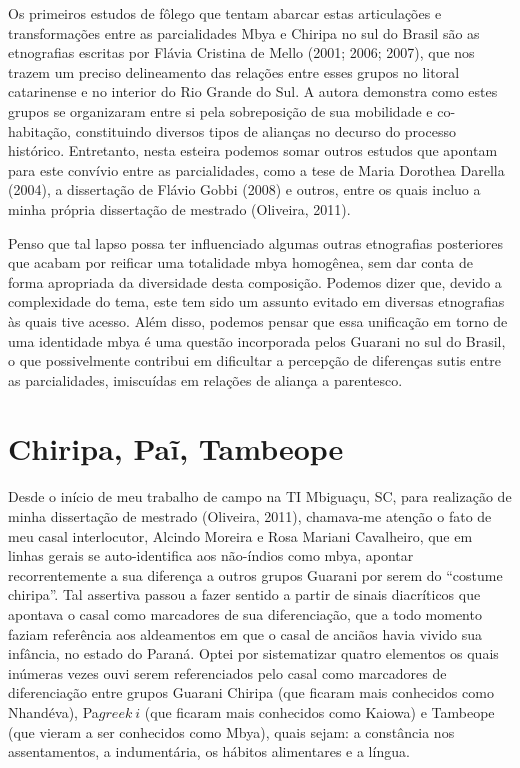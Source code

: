 Os primeiros estudos de fôlego que tentam abarcar estas articulações e
transformações entre as parcialidades Mbya e Chiripa no sul do Brasil
são as etnografias escritas por Flávia Cristina de Mello (2001; 2006;
2007), que nos trazem um preciso delineamento das relações entre esses
grupos no litoral catarinense e no interior do Rio Grande do Sul. A
autora demonstra como estes grupos se organizaram entre si pela
sobreposição de sua mobilidade e co-habitação, constituindo diversos
tipos de alianças no decurso do processo histórico. Entretanto, nesta
esteira podemos somar outros estudos que apontam para este convívio
entre as parcialidades, como a tese de Maria Dorothea Darella (2004), a
dissertação de Flávio Gobbi (2008) e outros, entre os quais incluo a
minha própria dissertação de mestrado (Oliveira, 2011). 

Penso que tal lapso possa ter influenciado algumas outras etnografias
posteriores que acabam por reificar uma totalidade mbya homogênea, sem
dar conta de forma apropriada da diversidade desta composição. Podemos
dizer que, devido a complexidade do tema, este tem sido um assunto
evitado em diversas etnografias às quais tive acesso. Além disso,
podemos pensar que essa unificação em torno de uma identidade mbya é
uma questão incorporada pelos Guarani no sul do Brasil, o que
possivelmente contribui em dificultar a percepção de diferenças sutis
entre as parcialidades, imiscuídas em relações de aliança a parentesco.

\section{Chiripa, Paĩ, Tambeope}

Desde o início de meu trabalho de campo na TI Mbiguaçu, SC, para
realização de minha dissertação de mestrado (Oliveira, 2011),
chamava-me atenção o fato de meu casal interlocutor, Alcindo Moreira e
Rosa Mariani Cavalheiro, que em linhas gerais se auto-identifica aos
não-índios como mbya, apontar recorrentemente a sua diferença a outros
grupos Guarani por serem do ``costume chiripa''. Tal assertiva passou a
fazer sentido a partir de sinais diacríticos que apontava o casal como
marcadores de sua diferenciação, que a todo momento faziam referência
aos aldeamentos em que o casal de anciãos havia vivido sua infância, no
estado do Paraná. Optei por sistematizar quatro elementos os quais
inúmeras vezes ouvi serem referenciados pelo casal como marcadores de
diferenciação entre grupos Guarani Chiripa (que ficaram mais conhecidos
como Nhandéva), Pa${greek{~i}}$ (que ficaram mais conhecidos
como Kaiowa) e Tambeope (que vieram a ser conhecidos como Mbya), quais
sejam: a constância nos assentamentos, a indumentária, os hábitos
alimentares e a língua. 

